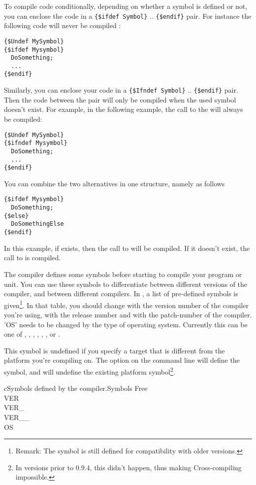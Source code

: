 \documentclass{report}
\begin{document}
To compile code conditionally, depending on whether a symbol is defined or
not, you can enclose the code in a \verb|{$ifdef Symbol}| .. \verb|{$endif}|
pair. For instance the following code will never be compiled :
\begin{verbatim}
{$Undef MySymbol}
{$ifdef Mysymbol}
  DoSomething;
  ...
{$endif}
\end{verbatim}

Similarly, you can enclose your code in a \verb|{$Ifndef Symbol}| .. \verb|{$endif}|
pair. Then the code between the pair will only be compiled when the used
symbol doesn't exist. For example, in the following example, the call to the
 will always be compiled:
\begin{verbatim}
{$Undef MySymbol}
{$ifndef Mysymbol}
  DoSomething;
  ...
{$endif}
\end{verbatim}

You can combine the two alternatives in one structure, namely as follows
\begin{verbatim}
{$ifdef Mysymbol}
  DoSomething;
{$else}
  DoSomethingElse
{$endif}
\end{verbatim}
In this example, if  exists, then the call to 
will be compiled. If it doesn't exist, the call to  is
compiled.

The \fpc compiler defines some symbols before starting to compile your
program or unit. You can use these symbols to differentiate between
different versions of the compiler, and between different compilers.
In , a list of pre-defined symbols is given\footnote{Remark:
The  symbol is still defined for compatibility with older versions.}. In that table,
you should change  with the version number of the compiler
you're using,  with the release number and 
with the patch-number of the compiler. 'OS' needs to be changed by the type
of operating system. Currently this can be one of , ,
, , , ,  or .

This symbol is undefined if you specify a target that is different from the
platform you're compiling on.
The  option on the command line will define the  symbol,
and will undefine the existing platform symbol\footnote{In versions prior to
0.9.4, this didn't happen, thus making Cross-compiling impossible.}.

\begin{FPCltable}{c}{Symbols defined by the compiler.}{Symbols} \hline
Free \\
VER \\
VER\_ \\
VER\_\_ \\
OS \\ \hline
\end{FPCltable}
\end{document}
